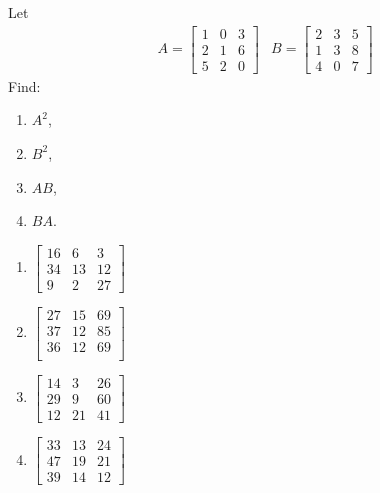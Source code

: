 \begin{Exercise}
Let 
\begin{align*}
& A =
\begin{bmatrix}
1 & 0 & 3\\
2 & 1 & 6\\
5 & 2 & 0
\end{bmatrix}
& B =
\begin{bmatrix}
2 & 3 & 5\\
1 & 3 & 8\\
4 & 0 & 7
\end{bmatrix}
\end{align*}
Find:
\begin{enumerate}[label=(\alph*)]
\item $A^2$,
\item $B^2$,
\item $AB$, 
\item $BA$.
\end{enumerate}
\end{Exercise}
\begin{Answer}
\begin{enumerate}[label=(\alph*)]
\item $\begin{bmatrix}
16 & 6 & 3 \\
34 & 13 & 12 \\
9 & 2 & 27
\end{bmatrix}$
\item $\begin{bmatrix}
27 & 15 & 69 \\
37 & 12 & 85 \\
36 & 12 & 69 \\
\end{bmatrix}$
\item $\begin{bmatrix}
14 & 3 & 26 \\
29 & 9 & 60 \\
12 & 21 & 41
\end{bmatrix}$
\item $\begin{bmatrix}
33 & 13 & 24 \\
47 & 19 & 21 \\
39 & 14 & 12
\end{bmatrix}$
\end{enumerate}    
\end{Answer}

